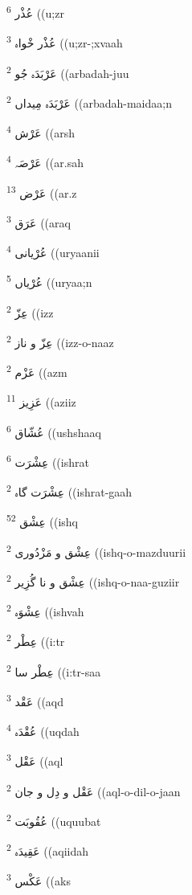 \documentclass[12pt]{article}
\begin{document}
\begin{RTL}
\begin{multicols}{5}
{\ur عُذْر}   \textsuperscript{6} ((u;zr

{\ur عُذْر خْواہ}   \textsuperscript{3} ((u;zr-;xvaah

{\ur عَرْبَدَہ جُو}   \textsuperscript{2} ((arbadah-juu

{\ur عَرْبَدَہ مِیداں}   \textsuperscript{2} ((arbadah-maidaa;n

{\ur عَرْش}   \textsuperscript{4} ((arsh

{\ur عَرْصَہ}   \textsuperscript{4} ((ar.sah

{\ur عَرْض}   \textsuperscript{13} ((ar.z

{\ur عَرَق}   \textsuperscript{3} ((araq

{\ur عُرْیانی}   \textsuperscript{4} ((uryaanii

{\ur عُرْیاں}   \textsuperscript{5} ((uryaa;n

{\ur عِزّ}   \textsuperscript{2} ((izz

{\ur عِزّ و ناز}   \textsuperscript{2} ((izz-o-naaz

{\ur عَزْم}   \textsuperscript{2} ((azm

{\ur عَزِیز}   \textsuperscript{11} ((aziiz

{\ur عُشّاق}   \textsuperscript{6} ((ushshaaq

{\ur عِشْرَت}   \textsuperscript{6} ((ishrat

{\ur عِشْرَت گاہ}   \textsuperscript{2} ((ishrat-gaah

{\ur عِشْق}   \textsuperscript{52} ((ishq

{\ur عِشْق و مَزْدُوری}   \textsuperscript{2} ((ishq-o-mazduurii

{\ur عِشْق و نا گُزِیر}   \textsuperscript{2} ((ishq-o-naa-guziir

{\ur عِشْوَہ}   \textsuperscript{2} ((ishvah

{\ur عِطْر}   \textsuperscript{2} ((i:tr

{\ur عِطْر سا}   \textsuperscript{2} ((i:tr-saa

{\ur عَقْد}   \textsuperscript{3} ((aqd

{\ur عُقْدَہ}   \textsuperscript{4} ((uqdah

{\ur عَقْل}   \textsuperscript{3} ((aql

{\ur عَقْل و دِل و جان}   \textsuperscript{2} ((aql-o-dil-o-jaan

{\ur عُقُوبَت}   \textsuperscript{2} ((uquubat

{\ur عَقِیدَہ}   \textsuperscript{2} ((aqiidah

{\ur عَکْس}   \textsuperscript{3} ((aks


\end{multicols}
\end{RTL}
\end{document}
